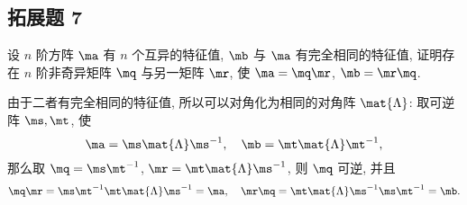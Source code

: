 \subsection*{ 拓展题 7 }
\begin{problem*}
设 $n$ 阶方阵 $\ma$ 有 $n$ 个互异的特征值, $\mb$ 与 $\ma$ 有完全相同的特征值, 证明存在 $n$ 阶非奇异矩阵 $\mq$ 与另一矩阵 $\mr$, 使 $\ma = \mq \mr$, $\mb = \mr \mq$.
\end{problem*}
\begin{solution}
由于二者有完全相同的特征值, 所以可以对角化为相同的对角阵 $\mat{\Lambda}$: 取可逆阵 $\ms, \mt$, 使
\[
\ma = \ms \mat{\Lambda} \ms^{-1}, \quad \mb = \mt \mat{\Lambda} \mt^{-1},
\]
那么取 $\mq = \ms \mt^{-1}$, $\mr = \mt \mat{\Lambda} \ms^{-1}$, 则 $\mq$ 可逆, 并且
\[
\mq \mr = \ms \mt^{-1} \mt \mat{\Lambda} \ms^{-1} = \ma, \quad \mr \mq = \mt \mat{\Lambda} \ms^{-1}\ms \mt^{-1} = \mb.
\]
\end{solution}

\newpage
\newcommand{\mpp}{\mat{P}}
